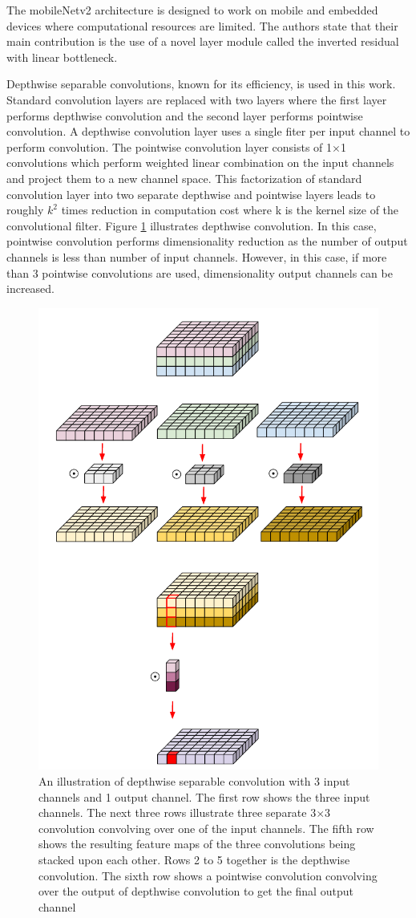 The mobileNetv2 architecture is designed to work on mobile and embedded devices where computational resources are limited. The authors state that their main contribution is the use of a novel layer module called the inverted residual with linear bottleneck. 

Depthwise separable convolutions, known for its efficiency, is used in this work. Standard convolution layers are replaced with two layers where the first layer performs depthwise convolution and the second layer performs pointwise convolution. A depthwise convolution layer uses a single fiter per input channel to perform convolution. The pointwise convolution layer consists of 1$\times$1 convolutions which perform weighted linear combination on the input channels and project them to a new channel space. This factorization of standard convolution layer into two separate depthwise and pointwise layers leads to roughly $k^2$ times reduction in computation cost where k is the kernel size of the convolutional filter. Figure \ref{Fig:depthwise} illustrates depthwise convolution. In this case, pointwise convolution performs dimensionality reduction as the number of output channels is less than number of input channels. However, in this case, if more than 3 pointwise convolutions are used, dimensionality output channels can be increased.

	\begin{figure}
		\centering
		\includegraphics[width=.5\linewidth]{images/depthwise}
		\caption{An illustration of depthwise separable convolution with 3 input channels and 1 output channel. The first row shows the three input channels. The next three rows illustrate three separate 3$\times$3 convolution convolving over one of the input channels. The fifth row shows the resulting feature maps of the three convolutions being stacked upon each other. Rows 2 to 5 together is the depthwise convolution. The sixth row shows a pointwise convolution convolving over the output of depthwise convolution to get the final output channel}
		\label{Fig:depthwise}
	\end{figure}

